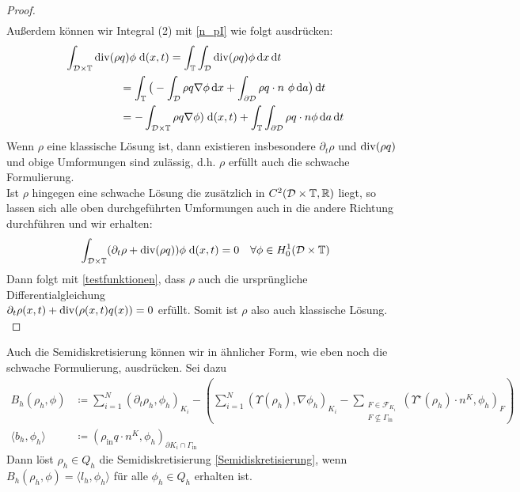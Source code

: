\begin{proof}
\begin{align*}
	\end{align*}
	Außerdem können wir Integral (2) mit  \ref{n_pI} wie folgt ausdrücken:
	\begin{align*}
	\int_{\mathcal{D} \times \mathbb{T}}  
	\operatorname{div}(\rho &q ) \phi\; \mathrm{d} (x,t) = \int_{\mathbb{T}} \int_{\mathcal{D}} \operatorname{div}(\rho q ) \phi \, \mathrm{d} x \, \mathrm{d} t \\
	&= \int_{\mathbb{T}} \big( - \int_{\mathcal{D}} \rho q \nabla \phi \, \mathrm{d} x + \int_{\partial \mathcal{D}} \rho q \cdot n \ \phi \, \mathrm{d} a \big)  \, \mathrm{d} t \\
	&= - \int_{\mathcal{D} \times \mathbb{T}} \rho q \nabla \phi) \; \mathrm{d} (x,t) + \int_{\mathbb{T}} \int_{\partial \mathcal{D}} \rho q \cdot n \phi \, \mathrm{d} a \, \mathrm{d} t 
	\end{align*}
	Wenn $ \rho  $ eine klassische Lösung ist, dann existieren insbesondere $ \partial_t \rho  $ und $ \operatorname{div}(\rho q) $ und obige Umformungen sind zulässig, d.h. $ \rho $ erfüllt auch die schwache Formulierung. \\
	Ist $ \rho $ hingegen eine schwache Lösung die zusätzlich in $ C^2(\mathcal{D}\times\mathbb{T},\mathbb{R}) $ liegt, so lassen sich alle oben durchgeführten Umformungen auch in die andere Richtung durchführen und wir erhalten: 
	\[
	\int_{\mathcal{D}\times\mathbb{T}} (\partial_t\rho + \operatorname{div}(\rho q))\phi \; \mathrm{d} (x,t) = 0 \quad \forall \phi \in H_0^1(\mathcal{D}\times\mathbb{T}) 
	\] 
	Dann folgt mit \ref{testfunktionen}, dass $ \rho $ auch die ursprüngliche Differentialgleichung\\
	$ \partial_t \rho(x,t) + \operatorname{div}(\rho(x,t) q(x)) = 0  $ erfüllt. Somit ist $ \rho $ also auch klassische Lösung.\\
	
\end{proof}

Auch die Semidiskretisierung können wir in ähnlicher Form, wie eben noch die schwache Formulierung, ausdrücken. Sei dazu
\begin{align*}
B_h(\rho_h,\phi) &\coloneqq \sum_{i=1}^{N} (\partial_t\rho_{h},\phi_h)_{K_i}  - \left( \sum_{i=1}^{N} (\Upsilon(\rho_h),\nabla \phi_h)_{K_i} - \sum_{\substack{F \in \mathcal{F}_{K_i} \\ F \not\subseteq \Gamma_{\text{in}}}} (\Upsilon^{\star}(\rho_h)\cdot n^K,\phi_h)_F\right) \\
\langle b_h , \phi_h \rangle &\coloneqq (\rho_{\text{in}}q \cdot n^K,\phi_h)_{\partial K_i \cap \Gamma_{\text{in}}}
\end{align*}
Dann löst $ \rho_h \in Q_h $ die Semidiskretisierung \ref{Semidiskretisierung}, wenn $ B_h(\rho_{h},\phi) = \langle l_h,\phi_h \rangle  $ für alle $ \phi_h \in Q_h$ erhalten ist.



